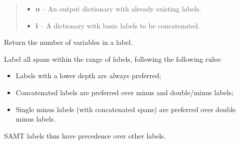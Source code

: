 \documentclass[letterpaper,10pt,english]{sphinxmanual}
\begin{document}
\begin{fulllineitems}
\begin{fulllineitems}
\begin{quote}
\begin{description}
\begin{itemize}
\item {} 
\textbf{o} -- An output dictionary with already existing labels.

\item {} 
\textbf{i} -- A dictionary with basic labels to be concatenated.

\end{itemize}

\end{description}\end{quote}

\end{fulllineitems}


\begin{fulllineitems}
\label{labelling:labelling.Labels.label_complexity}
Return the number of variables in a label.

\end{fulllineitems}


\begin{fulllineitems}
\label{labelling:labelling.Labels.label_most}
Label all spans within the range of labels, following the following rules:
\begin{itemize}
\item {} 
Labels with a lower depth are always preferred;

\item {} 
Concatenated labels are preferred over minus and double/minus labels;

\item {} 
Single minus labels (with concatenated spans) are preferred over double minus labels.

\end{itemize}

SAMT labels thus have precedence over other labels.

\end{fulllineitems}



\end{fulllineitems}
\end{document}
